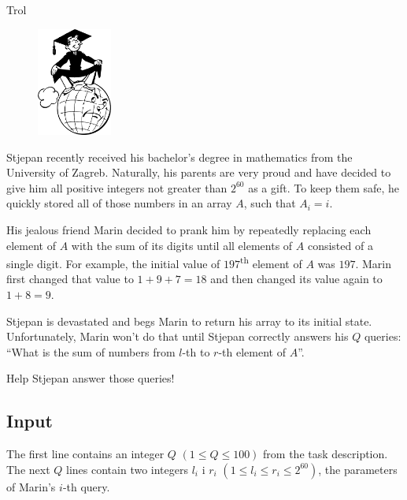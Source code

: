\begin{statement}[
  problempoints=50,
  timelimit=1 second,
  memorylimit=512 MiB,
]{Trol}

\setlength\intextsep{-0.1cm}
\begin{figure}
\centering
\includegraphics[width=0.22\textwidth]{img/diploma.png}
\end{figure}


Stjepan recently received his bachelor's degree in mathematics from the
University of Zagreb. Naturally, his parents are very proud and have decided
to give him all positive integers not greater than $2^{60}$ as a gift. To keep
them safe, he quickly stored all of those numbers in an array $A$, such that
$A_i = i$.

His jealous friend Marin decided to prank him by repeatedly replacing each
element of $A$ with the sum of its digits until all elements of $A$ consisted
of a single digit. For example, the initial value of $197$\textsuperscript{th}
element of $A$ was $197$. Marin first changed that value to $1 + 9 + 7 = 18$ and
then changed its value again to $1 + 8 = 9$.

Stjepan is devastated and begs Marin to return his array to its initial state.
Unfortunately, Marin won't do that until Stjepan correctly answers his $Q$
queries: ``What is the sum of numbers from $l$-th to $r$-th element of $A$''.

Help Stjepan answer those queries!

\subsection*{Input}
The first line contains an integer $Q$ $(1 \le Q \le 100)$ from the task
description. \\
The next $Q$ lines contain two integers $l_i$ i $r_i$
$(1 \le l_i \le r_i \le 2^{60})$, the parameters of Marin's $i$-th query.


\end{statement}
